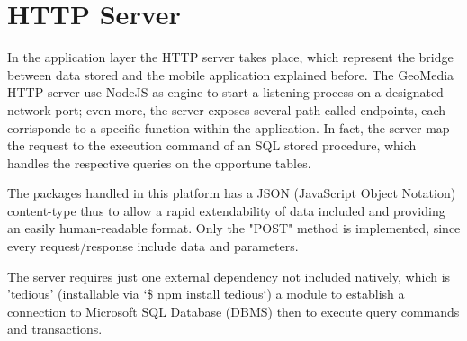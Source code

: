 \documentclass[conference]{IEEEtran}
\begin{document}
\section{HTTP Server}

In the application layer the HTTP server takes place, which represent the bridge between data stored and the mobile application explained before.
The GeoMedia HTTP server use NodeJS\cite{b4} as engine to start a listening process on a designated network port; even more, the server exposes several path called endpoints, each corrisponde to a specific function within the application. In fact, the server map the request to the execution command of an SQL stored procedure, which handles the respective queries on the opportune tables.

The packages handled in this platform has a JSON (JavaScript Object Notation) content-type thus to allow a rapid extendability of data included and providing an easily human-readable format.
Only the "POST" method is implemented, since every request/response include data and parameters.

The server requires just one external dependency not included natively, which is 'tedious'\cite{b5} (installable via `\$ npm install tedious`) a module to establish a connection to Microsoft SQL Database (DBMS) then to execute query commands and transactions.
\end{document}
